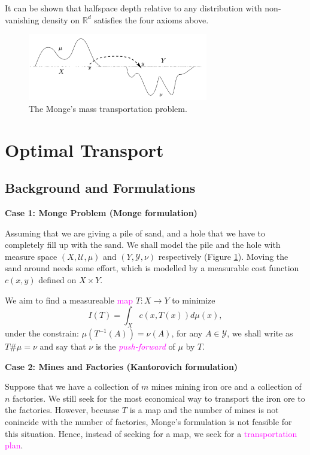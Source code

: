 It can be shown that halfspace depth relative to any distribution with non-vanishing density on $\mathbb{R}^d$ satisfies the four axioms above. 

\begin{figure}
	\centering
	\includegraphics[width = 0.7\textwidth]{Figures/MongePro.png}
	\caption{The Monge's mass transportation problem.}
	\label{fg: monge}
\end{figure}

\section{Optimal Transport}
\subsection{Background and Formulations}
\textbf{Case 1: Monge Problem (Monge formulation)}

Assuming that we are giving a pile of sand, and a hole that we have to completely fill up with the sand. We shall model the pile and the hole with measure space $(X, \mathcal{U}, \mu)$ and $(Y, \mathcal{Y}, \nu)$ respectively (Figure \ref{fg: monge}). Moving the sand around needs some effort, which is modelled by a measurable cost function $c(x, y)$ defined on $X \times Y$. 
\begin{problem}
	We aim to find a measureable \textcolor{magenta}{map} $T : X \to Y$ to minimize 
	\[
	I(T) = \int_{X} c(x, T(x)) d \mu(x), \nonumber
	\]
	under the constrain: $\mu(T^{-1}(A)) = \nu(A)$, for any $A \in \mathcal{Y}$, we shall write as $T\#\mu = \nu$ and say that $\nu$ is the \textit{\textcolor{magenta}{push-forward}} of $\mu$ by $T$.
\end{problem}

\noindent \textbf{Case 2: Mines and Factories (Kantorovich formulation)}

Suppose that we have a collection of $m$ mines mining iron ore and a collection of $n$ factories. We still seek for the most economical way to transport the iron ore to the factories. However, becuase $T$ is a map and the number of mines is not conincide with the number of factories, Monge's formulation is not feasible for this situation. Hence, instead of seeking for a map, we seek for a \textcolor{magenta}{transportation plan}. 

